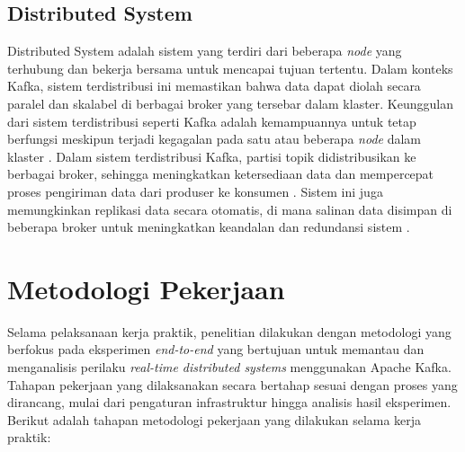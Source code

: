 \subsection{Distributed System}

Distributed System adalah sistem yang terdiri dari beberapa \textit{node} yang terhubung dan bekerja bersama untuk mencapai tujuan tertentu. Dalam konteks Kafka, sistem terdistribusi ini memastikan bahwa data dapat diolah secara paralel dan skalabel di berbagai broker yang tersebar dalam klaster. Keunggulan dari sistem terdistribusi seperti Kafka adalah kemampuannya untuk tetap berfungsi meskipun terjadi kegagalan pada satu atau beberapa \textit{node} dalam klaster \citep{ieee:distributed}. Dalam sistem terdistribusi Kafka, partisi topik didistribusikan ke berbagai broker, sehingga meningkatkan ketersediaan data dan mempercepat proses pengiriman data dari produser ke konsumen \citep{ieee:distributed}. Sistem ini juga memungkinkan replikasi data secara otomatis, di mana salinan data disimpan di beberapa broker untuk meningkatkan keandalan dan redundansi sistem \citep{ieee:distributed}.

\section{Metodologi Pekerjaan}

Selama pelaksanaan kerja praktik, penelitian dilakukan dengan metodologi yang berfokus pada eksperimen \textit{end-to-end} yang bertujuan untuk memantau dan menganalisis perilaku \textit{real-time distributed systems} menggunakan Apache Kafka. Tahapan pekerjaan yang dilaksanakan secara bertahap sesuai dengan proses yang dirancang, mulai dari pengaturan infrastruktur hingga analisis hasil eksperimen. Berikut adalah tahapan metodologi pekerjaan yang dilakukan selama kerja praktik:

